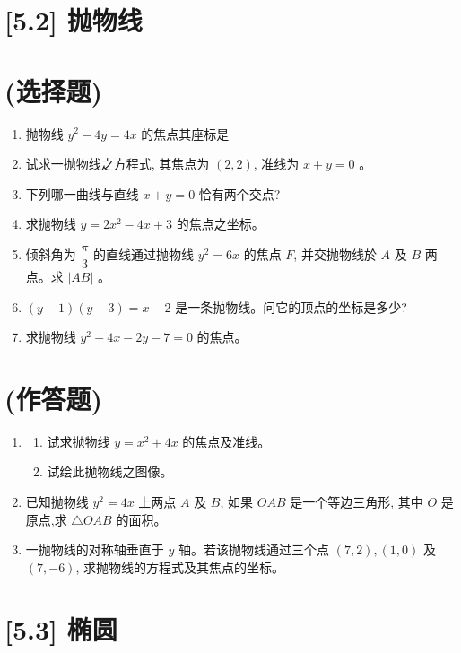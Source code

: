 \documentclass[10pt]{article}
\begin{document}
\section*{[5.2] 抛物线}
\section*{(选择题)}
\begin{enumerate}
  \item 抛物线 $y^{2}-4 y=4 x$ 的焦点其座标是 
  \item 试求一抛物线之方程式, 其焦点为 $(2,2)$, 准线为 $x+y=0$ 。
  \item 下列哪一曲线与直线 $x+y=0$ 恰有两个交点?
  \item 求抛物线 $y=2 x^{2}-4 x+3$ 的焦点之坐标。
  \item 倾斜角为 $\dfrac{\pi}{3}$ 的直线通过抛物线 $y^{2}=6 x$ 的焦点 $F$, 并交抛物线於 $A$ 及 $B$ 两点。求 $|AB|$ 。
  \item $(y-1)(y-3)=x-2$ 是一条抛物线。问它的顶点的坐标是多少?
  \item 求抛物线 $y^{2}-4 x-2 y-7=0$ 的焦点。
\end{enumerate}

\section*{(作答题)}
\begin{enumerate}
  \item \begin{enumerate}
    \item 试求抛物线 $y=x^{2}+4 x$ 的焦点及准线。
    \item 试绘此抛物线之图像。
  \end{enumerate}
  \item 已知抛物线 $y^{2}=4 x$ 上两点 $A$ 及 $B$, 如果 $OAB$ 是一个等边三角形, 其中 $O$ 是原点,求 $\triangle OAB$ 的面积。
  \item 一抛物线的对称轴垂直于 $y$ 轴。若该抛物线通过三个点 $(7,2),(1,0)$ 及 $(7,-6)$, 求抛物线的方程式及其焦点的坐标。
\end{enumerate}

\section*{[5.3] 椭圆}
\end{document}
